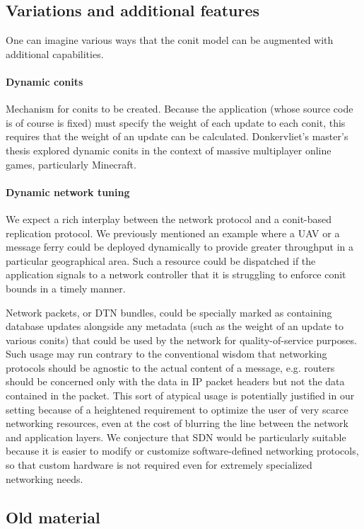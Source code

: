 \documentclass[]             %
{NASA}                       %
\theoremstyle{definition}
\begin{document}
\subsection{Variations and additional features}
One can imagine various ways that the conit model can be augmented
with additional capabilities.

\paragraph{Dynamic conits}
Mechanism for conits to be created. Because the application (whose
source code is of course is fixed) must specify the weight of each
update to each conit, this requires that the weight of an update can
be calculated. Donkervliet's master's thesis \citationneeded explored
dynamic conits in the context of massive multiplayer online games,
particularly Minecraft.

\paragraph{Dynamic network tuning}
We expect a rich interplay between the network protocol and a
conit-based replication protocol. We previously mentioned an example
where a UAV or a message ferry could be deployed dynamically to
provide greater throughput in a particular geographical area. Such a
resource could be dispatched if the application signals to a network
controller that it is struggling to enforce conit bounds in a timely
manner.

Network packets, or DTN bundles, could be specially marked as
containing database updates alongside any metadata (such as the weight
of an update to various conits) that could be used by the network for
quality-of-service purposes. Such usage may run contrary to the
conventional wisdom that networking protocols should be agnostic to
the actual content of a message, e.g. routers should be concerned only
with the data in IP packet headers but not the data contained in the
packet. This sort of atypical usage is potentially justified in our
setting because of a heightened requirement to optimize the user of
very scarce networking resources, even at the cost of blurring the
line between the network and application layers. We conjecture that
SDN would be particularly suitable because it is easier to modify or
customize software-defined networking protocols, so that custom
hardware is not required even for extremely specialized networking
needs.

\subsection{Old material}
\end{document}
